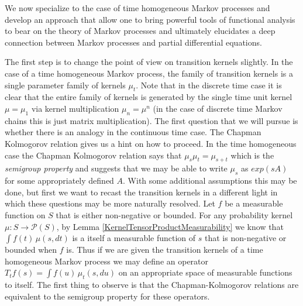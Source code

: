 We now specialize to the case of time homogeneous Markov processes and
develop an approach that allow one to bring powerful tools of
functional analysis to bear on the theory of Markov processes and
ultimately elucidates a deep connection between Markov processes and
partial differential equations.  

The first step is to change the point of view on transition kernels
slightly.  In the case of a time homogeneous Markov process, the
family of transition kernels is a single parameter family of kernels
$\mu_t$.  Note that in the discrete time case it is clear that the
entire family of kernels is generated by the single time unit kernel
$\mu = \mu_1$ via kernel multiplication $\mu_n = \mu^{n}$ (in
the case of discrete time Markov chains this is just matrix multiplication).  The
first question that we will pursue is whether there is an analogy in
the continuous time case.  The Chapman Kolmogorov relation gives us a
hint on how to proceed.  In the time homogeneous case the Chapman
Kolmogorov relation says that $\mu_s \mu_t = \mu_{s+t}$ which is the
\emph{semigroup property} and suggests that we may be able to write
$\mu_s$ as $exp(s A)$ for some appropriately defined $A$.  With
some additional assumptions this may be done, but first we want to
recast the transition kernels in a different light in which these
questions may be more naturally resolved.  Let $f$ be a measurable
function on $S$ that is either non-negative or bounded.  For any
probability kernel $\mu : S \to \mathcal{P}(S)$, by
Lemma \ref{KernelTensorProductMeasurability} we know that $\int f(t)
\, \mu(s,dt)$ is a itself a measurable function of $s$ that is non-negative
or bounded when $f$ is.  Thus if we are given the transition kernels
of a time homogeneous Markov process we may define an operator $T_tf
(s) = \int f(u) \, \mu_t(s, du)$ on an appropriate space of measurable
functions to itself.  The first thing to observe is that the
Chapman-Kolmogorov relations are equivalent to the semigroup property
for these operators.


